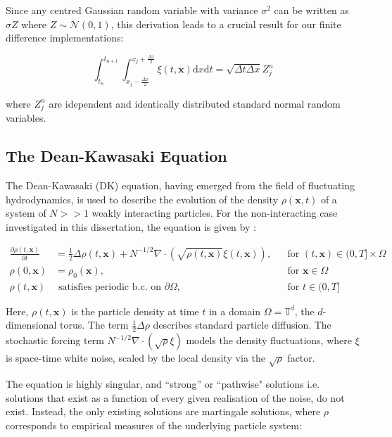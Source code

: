 Since any centred Gaussian random variable with variance $\sigma^2$ can be written as $\sigma Z$ where 
$Z \sim \mathcal{N}(0,1)$, this derivation leads to a crucial 
result for our finite difference implementations:

\begin{equation}\label{eq:white_noise_result}
    \int_{t_n}^{t_{n+1}} \int_{x_j - \frac{\Delta x}{2}}^{x_j + \frac{\Delta x}{2}} \xi(t, \mathbf{x})
    \mathrm{d}x \mathrm{d}t = \sqrt{\Delta t \Delta x} Z_j^n
\end{equation}

where $Z_j^n$ are idependent and identically distributed standard normal random variables.

\subsection{The Dean-Kawasaki Equation}

The Dean-Kawasaki (DK) equation, having emerged from the field of fluctuating 
hydrodynamics, is used to describe the evolution of the density 
$\rho(\mathbf{x}, t)$ of a system of $N >> 1$ weakly interacting particles.
For the non-interacting case investigated in this dissertation, the equation is given by
\cite{cornalba2025multilevel}:

\begin{align}\label{eq:dk_spde_2}
\frac{\partial \rho(t, \mathbf{x})}{\partial t} &=
\frac{1}{2}\Delta\rho(t, \mathbf{x}) + N^{-1/2}\nabla\cdot(\sqrt{\rho(t, \mathbf{x})}\xi(t, \mathbf{x})), 
&& \text{for } (t, \mathbf{x}) \in (0, T] \times \Omega \tag{DK} \\
\rho(0, \mathbf{x}) &= \rho_0(\mathbf{x}), && \text{for } \mathbf{x} \in \Omega \nonumber \\
\rho(t, \mathbf{x}) &\text{ satisfies periodic b.c. on } \partial \Omega, && \text{for } t \in (0, T] \nonumber
\end{align}

Here, $\rho(t, \mathbf{x})$ is the particle density at time $t$ in a 
domain $\Omega = \mathbb{T}^d$, the $d$-dimensional torus. 
The term $\frac{1}{2} \Delta \rho$ describes
standard particle diffusion. The stochastic forcing term $N^{-1/2}
\nabla \cdot (\sqrt{\rho}\xi)$ models the density fluctuations,
where $\xi$ is space-time white noise, scaled by the local density 
via the $\sqrt{\rho}$ factor.


The equation is highly singular, and ``strong'' or ``pathwise" solutions 
i.e. solutions that exist as a function of every given realisation 
of the noise, do not exist. Instead, the only existing solutions are martingale 
solutions, where $\rho$ corresponds to empirical measures of the underlying 
particle system:

